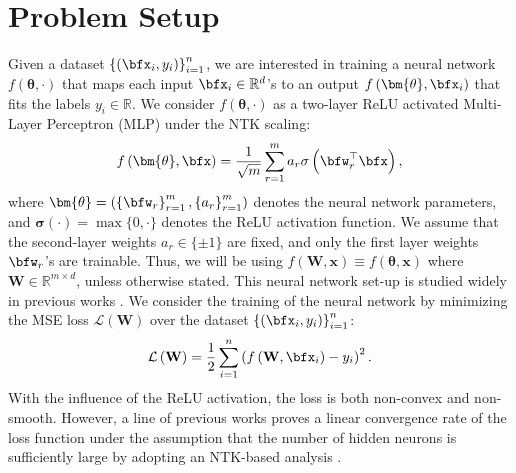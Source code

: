 \documentclass[10pt]{article} %
\theoremstyle{definition}
\theoremstyle{plain}
\newcommand{\paren}[1]{\left(#1\right)}
\providecommand{\R}{\mathbb{R}}
\def\calL{{\mathcal{L}}}
\begin{document}
\section{Problem Setup}
\label{sec:problem}
Given a dataset $\left\{\paren{\bfx_i, y_i}\right\}_{i=1}^n$, we are interested in training a neural network $f\paren{\bm{\theta},\cdot}$ that maps each input $\bfx_i\in\R^d$'s to an output $f\paren{\bm{\theta},\bfx_i}$ that fits the labels $y_i\in\R$. 
We consider $f\paren{\bm{\theta},\cdot}$ as a two-layer ReLU activated Multi-Layer Perceptron (MLP) under the NTK scaling:
\[
    f\paren{\bm{\theta},\bfx} = \frac{1}{\sqrt{m}}\sum_{r=1}^ma_r\sigma\paren{\bfw_r^\top\bfx},
\]
where $\bm{\theta} = \paren{\left\{\bfw_r\right\}_{r=1}^m,\left\{a_r\right\}_{r=1}^m}$ denotes the neural network parameters, and $\bm{\sigma}\paren{\cdot} = \max\{0,\cdot\}$ denotes the ReLU activation function. 
We assume that the second-layer weights $a_r\in\{\pm 1\}$ are fixed, and only the first layer weights $\bfw_r$'s are trainable. 
Thus, we will be using $f(\mathbf{W}, \mathbf{x}) \equiv f(\bm{\theta}, \mathbf{x})$ where $\mathbf{W} \in \mathbb{R}^{m \times d}$, unless otherwise stated.
This neural network set-up is studied widely in previous works \citep{du2018gradient}. 
We consider the training of the neural network by minimizing the MSE loss $\calL\paren{\mathbf{W}}$ over the dataset $\left\{\paren{\bfx_i, y_i}\right\}_{i=1}^n$:
\begin{equation*}
    \calL\paren{\mathbf{W}} = \frac{1}{2}\sum_{i=1}^n\paren{f\paren{\mathbf{W},\bfx_i}-y_i}^2.
\end{equation*}
With the influence of the ReLU activation, the loss is both non-convex and non-smooth. 
However, a line of previous works \citep{du2018gradient, song2020quadraticsufficesoverparametrizationmatrix, oymak2019moderateoverparameterizationglobalconvergence} proves a linear convergence rate of the loss function under the assumption that the number of hidden neurons is sufficiently large by adopting an NTK-based analysis \citep{jacot2018neural}. 
\end{document}

